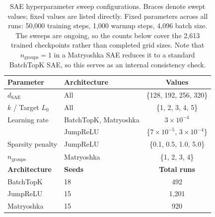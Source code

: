 \begin{table}[htbp]
\centering
\caption{
SAE hyperparameter sweep configurations. Braces denote swept values; fixed values are listed directly.
Fixed parameters across all runs: 50,000 training steps, 1,000 warmup steps, 4,096 batch size.
The sweeps are ongoing, so the counts below cover the 2,613 trained checkpoints rather than completed grid sizes. Note that $n_\text{groups}=1$ in a Matryoshka SAE reduces it to a standard BatchTopK SAE, so this serves as an internal consistency check.
}
\label{tab:sae_sweep_configs}
\begin{tabular}{llc}
\toprule
\textbf{Parameter} & \textbf{Architecture} & \textbf{Values} \\
\midrule
$d_{\mathrm{SAE}}$        & All         & \{128, 192, 256, 320\} \\
$k$ / Target $L_0$        & All & \{1, 2, 3, 4, 5\} \\
Learning rate              & BatchTopK, Matryoshka & $3\!\times\!10^{-4}$ \\
                           & JumpReLU    & \{$7\!\times\!10^{-5}$, $3\!\times\!10^{-4}$\} \\
Sparsity penalty           & JumpReLU    & \{0.1, 0.5, 1.0, 5.0\} \\
$n_{\text{groups}}$        & Matryoshka  & \{1, 2, 3, 4\} \\
\midrule
\textbf{Architecture} & \textbf{Seeds} & \textbf{Total runs} \\
\midrule
BatchTopK   & 18 & 492 \\
JumpReLU    & 15 & 1,201 \\
Matryoshka  & 15 & 920 \\
\bottomrule
\end{tabular}
\end{table}

